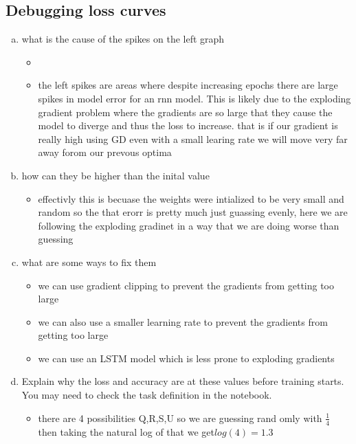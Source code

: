 \documentclass{article}
\begin{document}
\subsection{Debugging loss curves}
\begin{enumerate} [(a)] 
   \item  what is the cause of the spikes on the left graph 
   \begin{itemize}
    \color{blue}
    \item 
    \item the left spikes are areas where despite increasing epochs there are large spikes in model error for an rnn model. This is likely due to the exploding gradient problem where the gradients are so large that they cause the model to diverge and thus the loss to increase. that is if our gradient is really high using GD even with a small learing rate we will move very far away forom our prevous optima
   \end{itemize}
    \item how can they be higher than the inital value
    \begin{itemize}
        \color{blue}
        \item effectivly this is becuase the weights were intialized to be very small and random so the that erorr is pretty much just guassing evenly, here we are following the exploding gradinet in a way that we are doing worse than guessing 
       \end{itemize}
    \item what are some ways to fix them 
    \begin{itemize}
        \color{blue}
        \item we can use gradient clipping to prevent the gradients from getting too large
        \item we can also use a smaller learning rate to prevent the gradients from getting too large
        \item we can use an LSTM model which is less prone to exploding gradients
       \end{itemize}
    \item Explain why the loss and accuracy are at these values before training
    starts. You may need to check the task definition in the notebook.
    \begin{itemize}
        \color{blue}
        \item there are 4 possibilities Q,R,S,U so we are guessing rand omly with $\frac{1}{4}$ then taking the natural log of that we get$log(4)=1.3$
       \end{itemize}
\end{enumerate}
\end{document}
